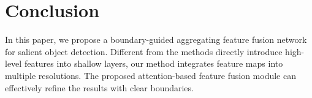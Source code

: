 \documentclass[journal]{IEEEtran}
\begin{document}
\section{Conclusion}
\label{sec:Conclusion}
In this paper, we propose a boundary-guided aggregating feature fusion network for salient object detection.
%
Different from the methods directly introduce high-level features into shallow layers, our method integrates feature maps into multiple resolutions.
%
The proposed attention-based feature fusion module can effectively refine the results with clear boundaries.




\ifCLASSOPTIONcaptionsoff
  \newpage
\fi









%
\end{document}
